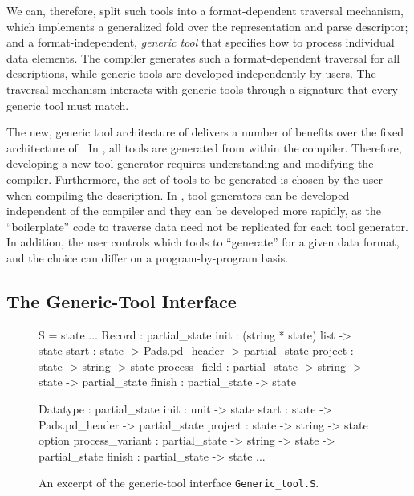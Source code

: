 We can, therefore, split such tools into a format-dependent traversal
mechanism, which implements a generalized fold over the representation
and parse descriptor; and a format-independent, \emph{generic tool}
that specifies how to process individual data elements. The \padsml{}
compiler generates such a format-dependent traversal for all
descriptions, while generic tools are developed independently by
users. The traversal mechanism interacts with generic tools through a
signature that every generic tool must match.

The new, generic tool architecture of \padsml{} delivers a number of
benefits over the fixed architecture of \padsc{}. In \padsc{}, all
tools are generated from within the compiler. Therefore, developing a
new tool generator requires understanding and modifying the compiler.
Furthermore, the set of tools to be generated is chosen by the user
when compiling the description.  In \padsml{}, tool generators can be
developed independent of the compiler and they can be developed more
rapidly, as the ``boilerplate'' code to traverse data need not be
replicated for each tool generator. In addition, the user controls
which tools to ``generate'' for a given data format, and the choice
can differ on a program-by-program basis.

\subsection{The Generic-Tool Interface}
\label{sec:gentool-interface}

\begin{figure}
\begin{code}\scriptsize
{}  S = 
   state
  ...
   Record : 
     partial_state
      init          : (string * state) list -> state
      start         : state -> Pads.pd_header 
                         -> partial_state
      project       : state -> string -> state
      process_field : partial_state -> string
                         -> state -> partial_state
      finish        : partial_state -> state

   Datatype : 
     partial_state
      init            : unit -> state
      start           : state -> Pads.pd_header 
                           -> partial_state
      project         : state -> string -> state option
      process_variant : partial_state -> string 
                           -> state -> partial_state
      finish          : partial_state -> state
   ...
\end{code}
\caption{An excerpt of the generic-tool interface \texttt{Generic\_tool.S}.}
\label{fig:gentool-interface}
\end{figure}


